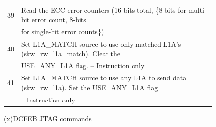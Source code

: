 \documentclass[10pt,a4paper]{article}
\begin{document}
\begin{figure}[H]
{\begin{tabular}{|l|l|}
  39     & Read the ECC error counters (16-bits total, \{8-bits for multi-bit error count, 8-bits \\
	       & for single-bit error counts\}) \\
  40     & Set L1A\_MATCH source to use only matched L1A's (skw\_rw\_l1a\_match). Clear the \\
	       & USE\_ANY\_L1A flag. -- Instruction only \\
  41     & Set L1A\_MATCH source to use any L1A to send data (skw\_rw\_l1a). Set the USE\_ANY\_L1A flag \\
	       & -- Instruction only \\ \hline
\end{tabular}}
\caption{(x)DCFEB JTAG commands}
\label{tab:dcfebcommands1}
\end{figure}
\end{document}
